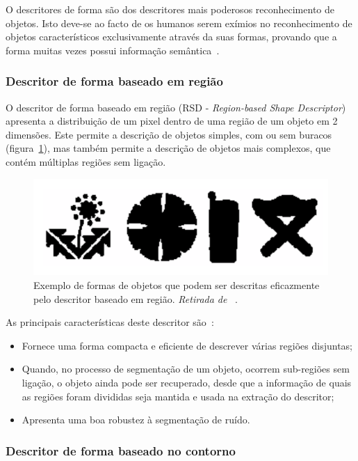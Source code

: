 O descritores de forma são dos descritores mais poderosos reconhecimento de objetos. Isto deve-se ao facto de os humanos serem exímios no reconhecimento de objetos característicos exclusivamente através da suas formas, provando que a forma muitas vezes possui informação semântica~\cite{Bober2001}.  

\subsubsection{Descritor de forma baseado em região}
O descritor de forma baseado em região (RSD - \textit{Region-based Shape Descriptor})~\cite{Bober2001} apresenta a distribuição de um pixel dentro de uma região de um objeto em 2 dimensões. Este permite a descrição de objetos simples, com ou sem buracos (figura~\ref{fig:shape1}), mas também permite a descrição de objetos mais complexos, que contém múltiplas regiões sem ligação.

\begin{figure}[h]
\centering
\includegraphics[width=0.7\linewidth]{./figures/shape1}
\caption{Exemplo de formas de objetos que podem ser descritas eficazmente pelo descritor baseado em região. \textit{Retirada de}~\cite{Bober2001} .}
\label{fig:shape1}
\end{figure}

As principais características deste descritor são~\cite{Bober2001}:

\begin{itemize}
\item Fornece uma forma compacta e eficiente de descrever várias regiões disjuntas;
\item Quando, no processo de segmentação de um objeto, ocorrem sub-regiões sem ligação, o objeto ainda pode ser recuperado, desde que a informação de quais as regiões foram divididas seja mantida e usada na extração do descritor;
\item Apresenta uma boa robustez à segmentação de ruído.
\end{itemize}

\subsubsection{Descritor de forma baseado no contorno}

